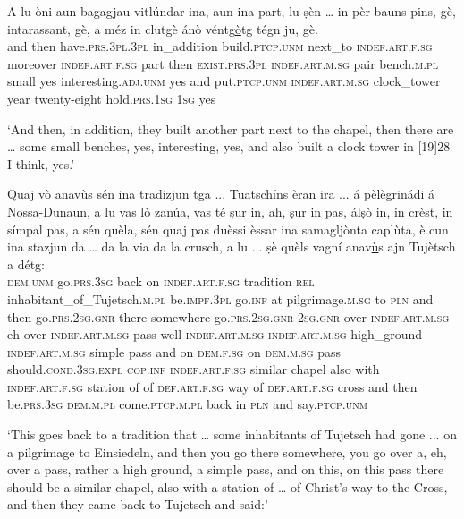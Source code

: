 \begin{linenumbers}
\gll  A lu òni aun bagagjau vitlúndar ina, aun ina part, lu ṣèn … in pèr bauns pins, gè, intarassant, gè, a méz in clutgè ánò véntg\underline{ò}tg tégn ju, gè.  \\
and then have.\textsc{prs.3pl}.\textsc{3pl} in\_addition build.\textsc{ptcp.unm} next\_to \textsc{indef.art.f.sg} moreover \textsc{indef.art.f.sg} part then \textsc{exist.prs.3pl} {} \textsc{indef.art.m.sg} pair bench.\textsc{m.pl} small yes interesting.\textsc{adj.unm} yes and put.\textsc{ptcp.unm} \textsc{indef.art.m.sg} clock\_tower year twenty-eight hold.\textsc{prs.1sg} \textsc{1sg} yes \\
\end{linenumbers} 
\medskip
\glt `And then, in addition, they built another part next to the chapel, then there are … some small benches, yes, interesting, yes, and also built a clock tower in [19]28 I think, yes.'
\medskip

\begin{linenumbers}
\gll   Quaj vò anav\underline{ù}s sén ina tradizjun tga ... Tuatschíns èran ira\footnotemark{} ... á pèlègrinádi á Nossa-Dunaun, a lu vas lò zanúa, vas té ṣur in, ah, ṣur in pas, álṣò in, in crèst, in símpal pas, a sén quèla, sén quaj pas duèssi èssar ina samagljònta caplùta, è cun ina stazjun da … da la via da la crusch, a lu ... ṣè quèls vagní anav\underline{ù}s ajn Tujètsch a détg: \\
 \textsc{dem.unm} go.\textsc{prs.3sg} back on \textsc{indef.art.f.sg} tradition \textsc{rel} {} inhabitant\_of\_Tujetsch.\textsc{m.pl} be.\textsc{impf.3pl} go.\textsc{inf} {} at pilgrimage.\textsc{m.sg} to \textsc{pln} and then go.\textsc{prs.2sg.gnr} there somewhere go.\textsc{prs.2sg.gnr} \textsc{2sg.gnr} over  \textsc{indef.art.m.sg} eh over \textsc{indef.art.m.sg} pass well \textsc{indef.art.m.sg} \textsc{indef.art.m.sg} high\_ground \textsc{indef.art.m.sg} simple pass and on \textsc{dem.f.sg} on \textsc{dem.m.sg} pass should.\textsc{cond.3sg.expl} \textsc{cop.inf} \textsc{indef.art.f.sg} similar chapel also with \textsc{indef.art.f.sg} station of {} of  \textsc{def.art.f.sg} way of \textsc{def.art.f.sg} cross and then {} be.\textsc{prs.3sg} \textsc{dem.m.pl} come.\textsc{ptcp.m.pl} back in \textsc{pln} and say.\textsc{ptcp.unm}  \\
\end{linenumbers}
\medskip
\glt `This goes back to a tradition that … some inhabitants of Tujetsch had gone ... on a pilgrimage to Einsiedeln, and then you go there somewhere, you go over a, eh, over a pass, rather a high ground, a simple pass, and on this, on this pass there should be a similar chapel, also with a station of … of Christ’s way to the Cross, and then they came back to Tujetsch and said:'
\medskip

